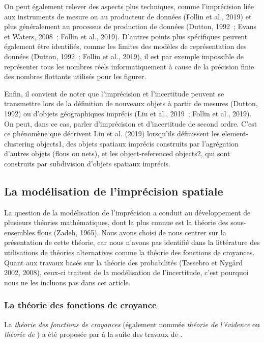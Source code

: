On peut également relever des aspects plus techniques, comme
l’imprécision liée aux instruments de mesure ou au producteur de
données (Follin et al., 2019) et plus généralement au processus de
production de données (Dutton, 1992 ; Evans et Waters, 2008 ; Follin
et al., 2019). D’autres points plus spécifiques peuvent également être
identifiés, comme les limites des modèles de représentation des
données (Dutton, 1992 ; Follin et al., 2019), il est par exemple
impossible de représenter tous les nombres réels informatiquement à
cause de la précision finie des nombres flottants utilisés pour les
figurer.

Enfin, il convient de noter que l’imprécision et l’incertitude peuvent
se transmettre lors de la définition de nouveaux objets à partir de
mesures (Dutton, 1992) ou d’objets géographiques imprécis (Liu et al.,
2019 ; Follin et al., 2019). On peut, dans ce cas, parler
d’imprécision et d’incertitude de second ordre. C’est ce phénomène que
décrivent Liu et al. (2019) lorsqu’ils définissent les
element-clustering objects1, des objets spatiaux imprécis construits
par l’agrégation d’autres objets (flous ou nets), et les
object-referenced objects2, qui sont construits par subdivision
d’objets spatiaux imprécis.

\subsection{La modélisation de l'imprécision spatiale}

La question de la modélisation de l’imprécision a conduit au
développement de plusieurs théories mathématiques, dont la plus connue
est la théorie des sous-ensembles flous (Zadeh, 1965). Nous avons
choisi de nous centrer sur la présentation de cette théorie, car nous
n’avons pas identifié dans la littérature des utilisations de théories
alternatives comme la théorie des fonctions de croyances. Quant aux
travaux basés sur la théorie des probabilités (Tøssebro et Nygård
2002, 2008), ceux-ci traitent de la modélisation de l’incertitude,
c’est pourquoi nous ne les incluons pas dans cet article.

\subsubsection{La théorie des fonctions de croyance}


La \emph{théorie des fonctions de croyances} (également nommée
\emph{théorie de l'évidence} ou \emph{théorie de
  }) a été proposée par \textcite{Shafer1976} à
la suite des travaux de \textcite{Dempster1967}.
  

